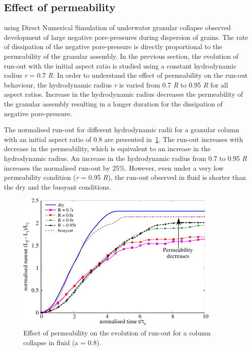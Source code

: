 
\subsection{Effect of permeability}
\citet{Topin2011} using Direct Numerical Simulation of underwater granular 
collapse observed development of large negative pore-pressures during 
dispersion of grains. The rate of dissipation of the negative pore-pressure is 
directly proportional to the permeability of the granular assembly. In the 
previous section, the evolution of run-out with the initial aspect ratio is 
studied using a constant hydrodynamic radius \textit{r} = 0.7 \textit{R}. In 
order to understand the effect of permeability on the run-out behaviour, the 
hydrodynamic radius \textit{r} is varied from 0.7 \textit{R} to 0.95 \textit{R} 
for all aspect ratios. Increase in the hydrodynamic radius decreases the 
permeability of the granular assembly resulting in a longer duration for the 
dissipation of negative pore-pressure. 

The normalised run-out for different hydrodynamic radii for a granular column 
with an initial aspect ratio of 0.8 are presented 
in~\cref{fig:Runout_a08_dense}. The run-out increases with decrease in the 
permeability, which is equivalent to an increase in the hydrodynamic radius. 
An increase in the hydrodynamic radius from 0.7 to 0.95 \textit{R} increases 
the normalised run-out by 25\%. However, even under a very low permeability 
condition (\textit{r} = 0.95 \textit{R}), the run-out observed in fluid is 
shorter than the dry and the buoyant conditions. 

\begin{figure}[htpb]
\centering
\includegraphics[width=0.9\textwidth]{Runout_a08_dense}
\caption{Effect of permeability on the evolution of run-out for a column 
collapse in fluid (a = 0.8).}
\label{fig:Runout_a08_dense}
\end{figure}


